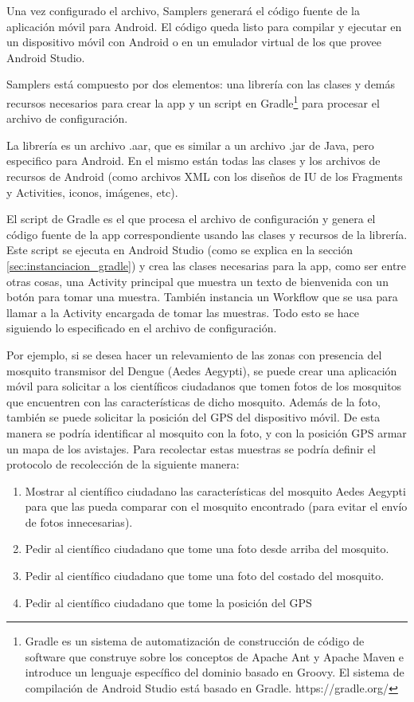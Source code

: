Una vez configurado el archivo, Samplers generará  el código fuente de la aplicación móvil para Android. El código queda listo para compilar y ejecutar en un dispositivo móvil con Android o en un emulador virtual de los que provee Android Studio.

Samplers está compuesto por dos elementos: una librería con las clases y demás recursos necesarios para crear la app y un script en Gradle\footnote{Gradle es un sistema de automatización de construcción de código de software que construye sobre los conceptos de Apache Ant y Apache Maven e introduce un lenguaje específico del dominio basado en Groovy. El sistema de compilación de Android Studio está basado en Gradle. https://gradle.org/} para procesar el archivo de configuración.

La librería es un archivo .aar, que es similar a un archivo .jar de Java, pero especifico para Android. En el mismo están todas las clases y los archivos de recursos de Android (como archivos XML con los diseños de IU de los Fragments y Activities, iconos, imágenes, etc).

El script de Gradle es el que procesa el archivo de configuración y genera el código fuente de la app correspondiente usando las clases y recursos de la librería.  Este script se ejecuta en Android Studio (como se explica en la sección \ref{sec:instanciacion_gradle}) y crea las clases necesarias para la app, como ser entre otras cosas, una Activity principal que muestra un texto de bienvenida con un botón para tomar una muestra. También instancia un Workflow que se usa para llamar a la Activity encargada de tomar las muestras. Todo esto se hace siguiendo lo especificado en el archivo de configuración.


Por ejemplo, si se desea hacer un relevamiento de las zonas con presencia del mosquito transmisor del Dengue (Aedes Aegypti), se puede crear una aplicación móvil para solicitar a los científicos ciudadanos que tomen fotos de los mosquitos que encuentren con las características de dicho mosquito. Además de la foto, también se puede solicitar la posición del GPS del dispositivo móvil. De esta manera se podría identificar al mosquito con la foto, y con la posición GPS armar un mapa de los avistajes. Para recolectar estas muestras se podría definir el protocolo de recolección de la siguiente manera:

\begin{enumerate}

\item Mostrar al científico ciudadano las características del mosquito Aedes Aegypti para que las pueda comparar con el mosquito encontrado (para evitar el envío de fotos innecesarias).

\item Pedir al científico ciudadano que tome una foto desde arriba del mosquito.

\item Pedir al científico ciudadano que tome una foto del costado del mosquito.

\item Pedir al científico ciudadano que tome la posición del GPS

\end{enumerate}


